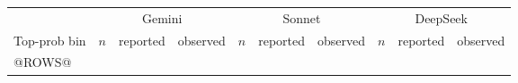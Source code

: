 \begin{tabular}{l*{9}{c}}
\toprule
 & \multicolumn{3}{c}{Gemini} & \multicolumn{3}{c}{Sonnet} & \multicolumn{3}{c}{DeepSeek}\\
\cmidrule(lr){2-4}\cmidrule(lr){5-7}\cmidrule(lr){8-10}
Top-prob bin & $n$ & reported & observed & $n$ & reported & observed & $n$ & reported & observed\\
\midrule
@ROWS@
\bottomrule
\end{tabular}
